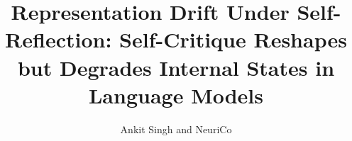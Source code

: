 \documentclass{article}
\title{Representation Drift Under Self-Reflection: Self-Critique Reshapes but Degrades Internal States in Language Models}
\author{Ankit Singh and NeuriCo}
\begin{document}
\maketitle

\begin{abstract}

\end{abstract}










\end{document}
